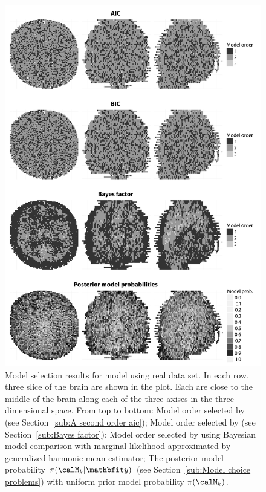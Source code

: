 \begin{figure}[t]
  \UseAltLinespread
  \centering
  \includegraphics[width=0.95\linewidth]{fig_src/PET_MO}
  \caption[Model selection results for the \protect\pet compartmental model]
  {Model selection results for \pet model using real data set. In each row, three slice of the brain are shown in the plot. Each are close to the middle of the brain along each of the three axises in the three-dimensional space. From top to bottom: Model order selected by \aicc (see Section~\ref{sub:A second order aic}); Model order selected by \bic (see Section~\ref{sub:Bayes factor}); Model order selected by using Bayesian model comparison with marginal likelihood approximated by generalized harmonic mean estimator; The posterior model probability $\pi(\calM_k|\data)$ (see Section~\ref{sub:Model choice problems}) with uniform prior model probability $\pi(\calM_k)$.}
  \label{fig:pet mo}
\end{figure}

